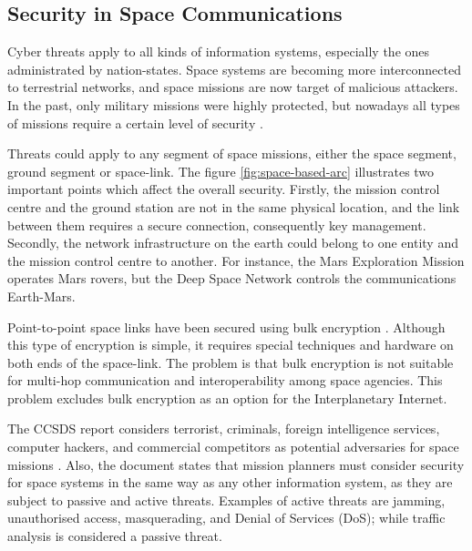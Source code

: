 \subsection{Security in Space Communications}


Cyber threats apply to all kinds of information systems, especially the ones administrated by nation-states. Space systems are becoming more interconnected to terrestrial networks, and space missions are now target of malicious attackers.  In the past, only military missions were highly protected, but nowadays all types of missions require a certain level of security \cite{book2006security}.

Threats could apply to any segment of space missions, either the space segment, ground segment or space-link. The figure \ref{fig:space-based-arc} illustrates two important points which affect the overall security.  Firstly, the mission control centre and the ground station are not in the same physical location, and the link between them requires a secure connection, consequently key management. Secondly, the network infrastructure on the earth could belong to one entity and the mission control centre to another.  For instance, the  Mars Exploration Mission operates Mars rovers, but the Deep Space Network controls the communications Earth-Mars.

Point-to-point space links have been secured using bulk encryption \cite{book2011space}. Although this type of encryption is simple, it requires special techniques and hardware on both ends of the space-link. The problem is that bulk encryption is not suitable for multi-hop communication and interoperability among space agencies. This problem excludes bulk encryption as an option for the Interplanetary Internet. %

The CCSDS report considers terrorist, criminals, foreign intelligence services, computer hackers, and commercial competitors as potential adversaries for space missions \cite{book2006security}.  Also, the document states that mission planners must consider security for space systems in the same way as any other information system, as they are subject to passive and active threats. Examples of active threats are jamming, unauthorised access, masquerading, and Denial of Services (DoS); while traffic analysis is considered a passive threat. 

